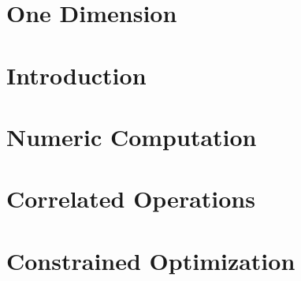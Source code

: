 \documentclass[12pt,letterpaper,oneside]{book}
\makeatletter
\theoremstyle{plain}
\theoremstyle{definition}
\theoremstyle{remark}
\numberwithin{theorem}{chapter}
\def\startabstractpage#1{%
 \newpage
 \setcounter{page}{1}   %
 \addcontentsline{toc}{chapter}{ABSTRACT}
 \@restonecolfalse\if@twocolumn\@restonecoltrue\onecolumn\fi
 \hbox{ }
 \twoinmar
 \centerline{ABSTRACT}
 \vspace{0.4in}
 \noindent #1
 \vspace{0.25in}\\
}
\makeatother
\begin{document}

\makeatletter
\if@twoside \setcounter{page}{4} \else \setcounter{page}{1} \fi
\makeatother



%


\chapter{One Dimension}

\chapter{Introduction}

\chapter{Numeric Computation}

\chapter{Correlated Operations}

\chapter{Constrained Optimization}

\end{document}

